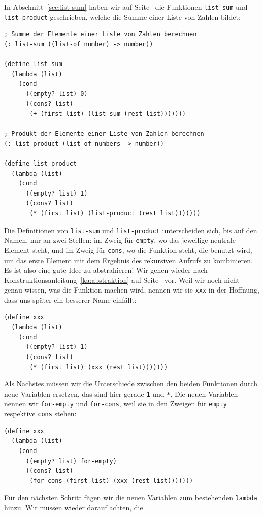 In Abschnitt~\ref{sec:list-sum} haben wir auf
Seite~\pageref{sec:list-sum} die Funktionen \lstinline{list-sum} und
\lstinline{list-product} geschrieben, welche die Summe einer Liste von
Zahlen bildet:
%
\begin{lstlisting}
; Summe der Elemente einer Liste von Zahlen berechnen
(: list-sum ((list-of number) -> number))

(define list-sum
  (lambda (list)
    (cond
      ((empty? list) 0)
      ((cons? list)
       (+ (first list) (list-sum (rest list)))))))

; Produkt der Elemente einer Liste von Zahlen berechnen
(: list-product (list-of-numbers -> number))

(define list-product
  (lambda (list)
    (cond
      ((empty? list) 1)
      ((cons? list)
       (* (first list) (list-product (rest list)))))))
\end{lstlisting}
%
Die Definitionen von \lstinline{list-sum} und \lstinline{list-product}
unterscheiden sich, bis auf den Namen, nur an zwei Stellen: im Zweig
für \lstinline{empty}, wo das jeweilige neutrale Element steht, und im
Zweig für \lstinline{cons}, wo die Funktion steht, die benutzt wird,
um das erste Element mit dem Ergebnis des rekursiven Aufrufs zu
kombinieren.  Es ist also eine gute Idee zu abstrahieren!
Wir gehen wieder nach Konstruktionsanleitung~\ref{ka:abstraktion} auf
Seite~\pageref{ka:abstraktion} vor.  Weil wir noch nicht genau wissen,
was die Funktion machen wird, nennen wir sie
\lstinline{xxx} in der Hoffnung, dass uns später ein besserer 
Name einfällt:
%
\begin{lstlisting}
(define xxx
  (lambda (list)
    (cond
      ((empty? list) 1)
      ((cons? list)
       (* (first list) (xxx (rest list)))))))
\end{lstlisting}
%
Als Nächstes müssen wir die Unterschiede zwischen den beiden
Funktionen durch neue Variablen ersetzen, das sind hier gerade
\lstinline{1} und \lstinline{*}.  Die neuen Variablen nennen wir
\lstinline{for-empty} und \lstinline{for-cons}, weil sie in den
Zweigen für \lstinline{empty} respektive \lstinline{cons} stehen:
%
\begin{lstlisting}
(define xxx
  (lambda (list)
    (cond
      ((empty? list) for-empty)
      ((cons? list)
       (for-cons (first list) (xxx (rest list)))))))
\end{lstlisting}
%
Für den nächsten Schritt fügen wir die neuen Variablen zum bestehenden
\lstinline{lambda} hinzu.  Wir müssen wieder darauf achten, die
